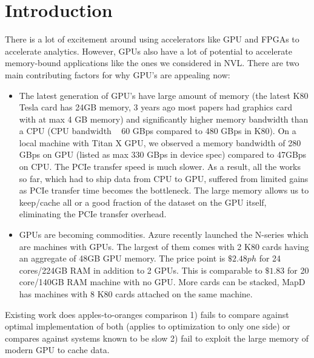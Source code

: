 \section{Introduction}

There is a lot of excitement around using accelerators like GPU and FPGAs to
accelerate analytics. However, GPUs also have a lot of potential to accelerate
memory-bound applications like the ones we considered in NVL. There are two main
contributing factors for why GPU's are appealing now:

\begin{itemize}
\item The latest generation of GPU's have large amount of memory (the latest K80
Tesla card has 24GB memory, 3 years ago most papers had graphics card with at
max 4 GB memory) and significantly higher memory bandwidth than a CPU (CPU
bandwidth ~ 60 GBps compared to 480 GBps in K80). On a local machine with Titan
X GPU, we observed a memory bandwidth of 280 GBps on GPU (listed as max 330 GBps
in device spec) compared to 47GBps on CPU. The PCIe transfer speed is much
slower. As a result, all the works so far, which had to ship data from CPU to
GPU, suffered from limited gains as PCIe transfer time becomes the bottleneck.
The large memory allows us to keep/cache all or a good fraction of the dataset
on the GPU itself, eliminating the PCIe transfer overhead. 

\item GPUs are becoming commodities. Azure recently launched the N-series which are
machines with GPUs. The largest of them comes with 2 K80 cards having an
aggregate of 48GB GPU memory. The price point is $\$2.48ph$ for 24 cores/224GB
RAM in addition to 2 GPUs. This is comparable to $\$1.83$ for 20 core/140GB RAM
machine with no GPU. More cards can be stacked, MapD has machines with 8 K80
cards attached on the same machine. 
\end{itemize}

Existing work does apples-to-oranges comparison 1) fails to compare against
optimal implementation of both (applies to optimization to only one side) or
compares against systems known to be slow 2) fail to exploit the large memory of
modern GPU to cache data.

